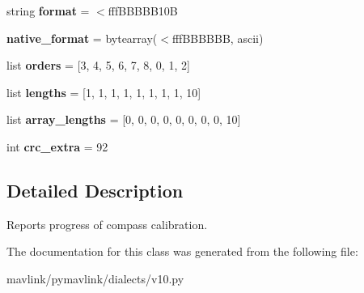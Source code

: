 \begin{DoxyCompactItemize}
\item 
\mbox{\label{classpymavlink_1_1dialects_1_1v10_1_1MAVLink__mag__cal__progress__message_a04af73f361e3a8fe4779c301dd62456b}} 
string {\bfseries format} = \textquotesingle{}$<$fff\+B\+B\+B\+B\+B10B\textquotesingle{}
\item 
\mbox{\label{classpymavlink_1_1dialects_1_1v10_1_1MAVLink__mag__cal__progress__message_a2a723b630a4024273a1f1072d54ede45}} 
{\bfseries native\+\_\+format} = bytearray(\textquotesingle{}$<$fff\+B\+B\+B\+B\+BB\textquotesingle{}, \textquotesingle{}ascii\textquotesingle{})
\item 
\mbox{\label{classpymavlink_1_1dialects_1_1v10_1_1MAVLink__mag__cal__progress__message_ad464ae43bc6f17277dc6eea556e93d64}} 
list {\bfseries orders} = \mbox{[}3, 4, 5, 6, 7, 8, 0, 1, 2\mbox{]}
\item 
\mbox{\label{classpymavlink_1_1dialects_1_1v10_1_1MAVLink__mag__cal__progress__message_a11662d24144323699733eae2f3263d04}} 
list {\bfseries lengths} = \mbox{[}1, 1, 1, 1, 1, 1, 1, 1, 10\mbox{]}
\item 
\mbox{\label{classpymavlink_1_1dialects_1_1v10_1_1MAVLink__mag__cal__progress__message_a714e6ae30e2f5dff6499758f7a80f308}} 
list {\bfseries array\+\_\+lengths} = \mbox{[}0, 0, 0, 0, 0, 0, 0, 0, 10\mbox{]}
\item 
\mbox{\label{classpymavlink_1_1dialects_1_1v10_1_1MAVLink__mag__cal__progress__message_ab52437ae15e11a6e0fd8ba4aec425f81}} 
int {\bfseries crc\+\_\+extra} = 92
\end{DoxyCompactItemize}


\subsection{Detailed Description}
\begin{DoxyVerb}Reports progress of compass calibration.
\end{DoxyVerb}
 

The documentation for this class was generated from the following file\+:\begin{DoxyCompactItemize}
\item 
mavlink/pymavlink/dialects/v10.\+py\end{DoxyCompactItemize}
